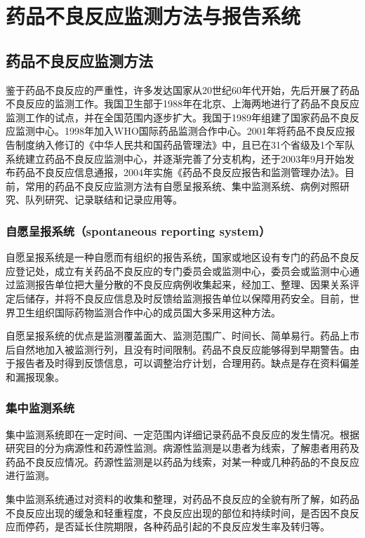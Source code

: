 \section{药品不良反应监测方法与报告系统}

\subsection{药品不良反应监测方法}

鉴于药品不良反应的严重性，许多发达国家从20世纪60年代开始，先后开展了药品不良反应的监测工作。我国卫生部于1988年在北京、上海两地进行了药品不良反应监测工作的试点，并在全国范围内逐步扩大。我国于1989年组建了国家药品不良反应监测中心。1998年加入WHO国际药品监测合作中心。2001年将药品不良反应报告制度纳入修订的《中华人民共和国药品管理法》中，且已在31个省级及1个军队系统建立药品不良反应监测中心，并逐渐完善了分支机构，还于2003年9月开始发布药品不良反应信息通报，2004年实施《药品不良反应报告和监测管理办法》。目前，常用的药品不良反应监测方法有自愿呈报系统、集中监测系统、病例对照研究、队列研究、记录联结和记录应用等。

\subsubsection{自愿呈报系统（spontaneous reporting system）}

自愿呈报系统是一种自愿而有组织的报告系统，国家或地区设有专门的药品不良反应登记处，成立有关药品不良反应的专门委员会或监测中心，委员会或监测中心通过监测报告单位把大量分散的不良反应病例收集起来，经加工、整理、因果关系评定后储存，并将不良反应信息及时反馈给监测报告单位以保障用药安全。目前，世界卫生组织国际药物监测合作中心的成员国大多采用这种方法。

自愿呈报系统的优点是监测覆盖面大、监测范围广、时间长、简单易行。药品上市后自然地加入被监测行列，且没有时间限制。药品不良反应能够得到早期警告。由于报告者及时得到反馈信息，可以调整治疗计划，合理用药。缺点是存在资料偏差和漏报现象。

\subsubsection{集中监测系统}

集中监测系统即在一定时间、一定范围内详细记录药品不良反应的发生情况。根据研究目的分为病源性和药源性监测。病源性监测是以患者为线索，了解患者用药及药品不良反应情况。药源性监测是以药品为线索，对某一种或几种药品的不良反应进行监测。

集中监测系统通过对资料的收集和整理，对药品不良反应的全貌有所了解，如药品不良反应出现的缓急和轻重程度，不良反应出现的部位和持续时间，是否因不良反应而停药，是否延长住院期限，各种药品引起的不良反应发生率及转归等。

